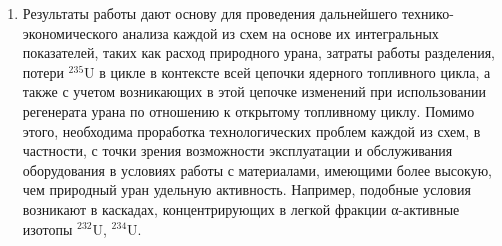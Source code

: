 \begin{enumerate}
\item Результаты работы дают основу для проведения дальнейшего технико-экономического анализа каждой из схем на основе их интегральных показателей, таких как расход природного урана, затраты работы разделения, потери $^{235}$U в цикле в контексте всей цепочки ядерного топливного цикла, а также с учетом возникающих в этой цепочке изменений при использовании регенерата урана по отношению к открытому топливному циклу. Помимо этого, необходима проработка технологических проблем каждой из схем, в частности, с точки зрения возможности эксплуатации и обслуживания оборудования в условиях работы с материалами, имеющими более высокую, чем природный уран удельную активность. Например, подобные условия возникают в каскадах, концентрирующих в легкой фракции α-активные изотопы $^{232}$U, $^{234}$U.
\end{enumerate}
